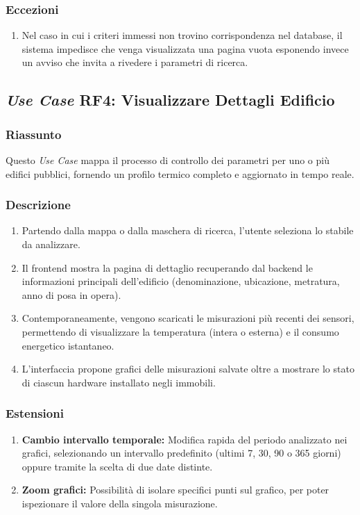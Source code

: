         \subsubsection*{Eccezioni}
            \begin{enumerate}
                \item Nel caso in cui i criteri immessi non trovino corrispondenza nel database, il sistema impedisce che venga visualizzata una pagina vuota esponendo invece un avviso che invita a rivedere i parametri di ricerca.
            \end{enumerate}

    \subsection*{\textit{Use Case} RF4: Visualizzare Dettagli Edificio}
        \subsubsection*{Riassunto}
            Questo \textit{Use Case} mappa il processo di controllo dei parametri per uno o più edifici pubblici, fornendo un profilo termico completo e aggiornato in tempo reale.
        \subsubsection*{Descrizione}
            \begin{enumerate}
                \item Partendo dalla mappa o dalla maschera di ricerca, l'utente seleziona lo stabile da analizzare.
                \item Il frontend mostra la pagina di dettaglio recuperando dal backend le informazioni principali dell'edificio (denominazione, ubicazione, metratura, anno di posa in opera).
                \item Contemporaneamente, vengono scaricati le misurazioni più recenti dei sensori, permettendo di visualizzare la temperatura (intera o esterna) e il consumo energetico istantaneo.
                \item L'interfaccia propone grafici delle misurazioni salvate oltre a mostrare lo  stato di ciascun hardware installato negli immobili.
            \end{enumerate}
        \subsubsection*{Estensioni}
            \begin{enumerate}
                \item \textbf{Cambio intervallo temporale:} Modifica rapida del periodo analizzato nei grafici, selezionando un intervallo predefinito (ultimi 7, 30, 90 o 365 giorni) oppure tramite la scelta di due date distinte.
                \item \textbf{Zoom grafici:} Possibilità di isolare specifici punti sul grafico, per poter ispezionare il valore della singola misurazione.
            \end{enumerate}
